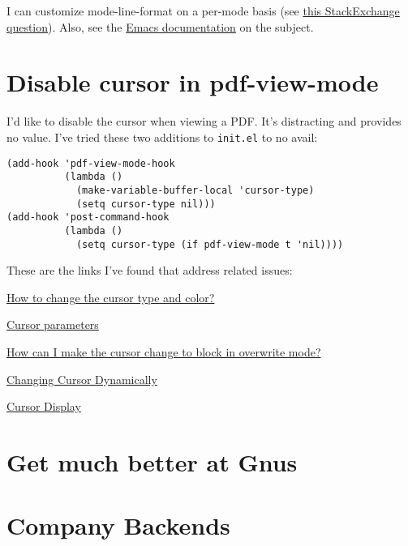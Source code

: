 \documentclass{default}
\begin{document}
I can customize mode-line-format on a per-mode basis (see
\href{https://emacs.stackexchange.com/questions/13652/how-to-customize-mode-line-format}{this
  StackExchange question}). Also, see the
\href{https://www.gnu.org/software/emacs/manual/html_node/elisp/Mode-Line-Variables.html#Mode-Line-Variables}{Emacs
  documentation} on the subject.

\section{Disable cursor in pdf-view-mode}

I'd like to disable the cursor when viewing a PDF. It's distracting and provides no value. I've
tried these two additions to \texttt{init.el} to no avail:

\begin{verbatim}
(add-hook 'pdf-view-mode-hook
          (lambda ()
            (make-variable-buffer-local 'cursor-type)
            (setq cursor-type nil)))
(add-hook 'post-command-hook
          (lambda ()
            (setq cursor-type (if pdf-view-mode t 'nil))))
\end{verbatim}

These are the links I've found that address related issues:

\href{https://emacs.stackexchange.com/questions/392/how-to-change-the-cursor-type-and-color}{How to
  change the cursor type and color?}

\href{https://www.gnu.org/software/emacs/manual/html_node/elisp/Cursor-Parameters.html}{Cursor
  parameters}

\href{https://emacs.stackexchange.com/questions/44650/how-can-i-make-the-cursor-change-to-block-in-overwrite-mode?rq=1}{How
  can I make the cursor change to block in overwrite mode?}

\href{https://www.emacswiki.org/emacs/ChangingCursorDynamically}{Changing Cursor Dynamically}

\href{https://www.gnu.org/software/emacs/manual/html_node/emacs/Cursor-Display.html}{Cursor Display}

\section{Get much better at Gnus}

\section{Company Backends}
\end{document}
